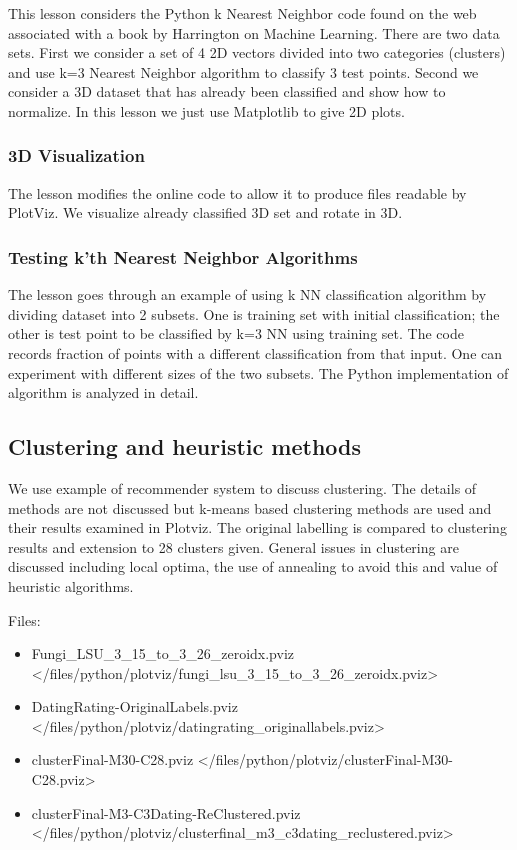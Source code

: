 This lesson considers the Python k Nearest Neighbor code found on the
web associated with a book by Harrington on Machine Learning. There are
two data sets. First we consider a set of 4 2D vectors divided into two
categories (clusters) and use k=3 Nearest Neighbor algorithm to classify
3 test points. Second we consider a 3D dataset that has already been
classified and show how to normalize. In this lesson we just use
Matplotlib to give 2D plots.

\subsubsection{3D Visualization}\label{d-visualization}

The lesson modifies the online code to allow it to produce files
readable by PlotViz. We visualize already classified 3D set and rotate
in 3D.

\subsubsection{Testing k'th Nearest Neighbor
Algorithms}\label{testing-kth-nearest-neighbor-algorithms}

The lesson goes through an example of using k NN classification
algorithm by dividing dataset into 2 subsets. One is training set with
initial classification; the other is test point to be classified by k=3
NN using training set. The code records fraction of points with a
different classification from that input. One can experiment with
different sizes of the two subsets. The Python implementation of
algorithm is analyzed in detail.

\subsection{Clustering and heuristic
methods}\label{clustering-and-heuristic-methods}

We use example of recommender system to discuss clustering. The details
of methods are not discussed but k-means based clustering methods are
used and their results examined in Plotviz. The original labelling is
compared to clustering results and extension to 28 clusters given.
General issues in clustering are discussed including local optima, the
use of annealing to avoid this and value of heuristic algorithms.

Files:

\begin{itemize}
\tightlist
\item
  Fungi\_LSU\_3\_15\_to\_3\_26\_zeroidx.pviz \textless{}/files/python/plotviz/fungi\_lsu\_3\_15\_to\_3\_26\_zeroidx.pviz\textgreater{}
\item
  DatingRating-OriginalLabels.pviz \textless{}/files/python/plotviz/datingrating\_originallabels.pviz\textgreater{}
\item
  clusterFinal-M30-C28.pviz \textless{}/files/python/plotviz/clusterFinal-M30-C28.pviz\textgreater{}
\item
  clusterFinal-M3-C3Dating-ReClustered.pviz \textless{}/files/python/plotviz/clusterfinal\_m3\_c3dating\_reclustered.pviz\textgreater{}
\end{itemize}

